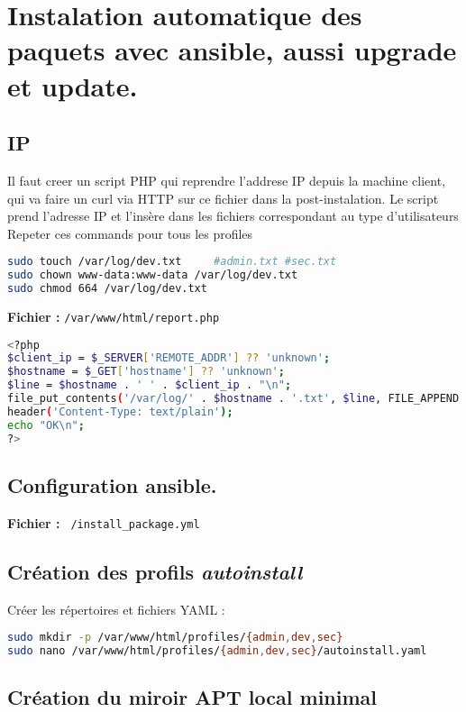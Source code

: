 \documentclass[a4paper,12pt]{article}
\begin{document}
\section{Instalation automatique des paquets avec ansible, aussi upgrade et update.}
\subsection{IP}
Il faut creer un script PHP qui reprendre l'addrese IP depuis la machine client, qui va faire un curl via HTTP sur ce fichier dans la post-instalation. Le script prend l'adresse IP et l'insère dans les fichiers correspondant au type d'utilisateurs
Repeter ces commands pour tous les profiles
\begin{lstlisting}[language=bash]
sudo touch /var/log/dev.txt     #admin.txt #sec.txt
sudo chown www-data:www-data /var/log/dev.txt
sudo chmod 664 /var/log/dev.txt
\end{lstlisting}

\textbf{Fichier :} \texttt{/var/www/html/report.php}
\begin{lstlisting}[language=bash]
<?php
$client_ip = $_SERVER['REMOTE_ADDR'] ?? 'unknown';
$hostname = $_GET['hostname'] ?? 'unknown';
$line = $hostname . ' ' . $client_ip . "\n";
file_put_contents('/var/log/' . $hostname . '.txt', $line, FILE_APPEND | LOCK_EX);
header('Content-Type: text/plain');
echo "OK\n";
?>
\end{lstlisting}

\subsection{Configuration ansible.}
\textbf{Fichier :} \texttt{~/install_package.yml}


\subsection{Création des profils \textit{autoinstall}}

Créer les répertoires et fichiers YAML :

\begin{lstlisting}[language=bash]
sudo mkdir -p /var/www/html/profiles/{admin,dev,sec}
sudo nano /var/www/html/profiles/{admin,dev,sec}/autoinstall.yaml
\end{lstlisting}

\subsection{Création du miroir APT local minimal}
\end{document}
